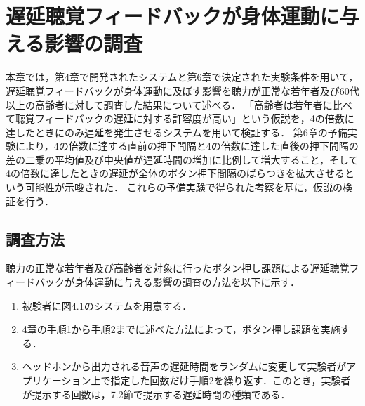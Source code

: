 \chapter{遅延聴覚フィードバックが身体運動に与える影響の調査}
本章では，第4章で開発されたシステムと第6章で決定された実験条件を用いて，遅延聴覚フィードバックが身体運動に及ぼす影響を聴力が正常な若年者及び60代以上の高齢者に対して調査した結果について述べる．
「高齢者は若年者に比べて聴覚フィードバックの遅延に対する許容度が高い」という仮説を，4の倍数に達したときにのみ遅延を発生させるシステムを用いて検証する．
第6章の予備実験により，4の倍数に達する直前の押下間隔と4の倍数に達した直後の押下間隔の差の二乗の平均値及び中央値が遅延時間の増加に比例して増大すること，そして4の倍数に達したときの遅延が全体のボタン押下間隔のばらつきを拡大させるという可能性が示唆された．
これらの予備実験で得られた考察を基に，仮説の検証を行う．
\section{調査方法}
聴力の正常な若年者及び高齢者を対象に行ったボタン押し課題による遅延聴覚フィードバックが身体運動に与える影響の調査の方法を以下に示す．
\begin{enumerate}
  \item 被験者に図4.1のシステムを用意する．
  \item 4章の手順1から手順2までに述べた方法によって，ボタン押し課題を実施する．
  \item ヘッドホンから出力される音声の遅延時間をランダムに変更して実験者がアプリケーション上で指定した回数だけ手順2を繰り返す．このとき，実験者が提示する回数は，7.2節で提示する遅延時間の種類である．
\end{enumerate}
\newpage
